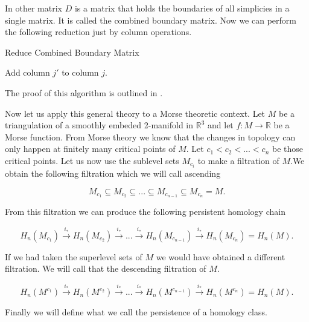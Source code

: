 In other matrix $D$ is a matrix that holds the boundaries of all simplicies in a single matrix. It is called the combined boundary matrix. Now we can perform the following reduction just by column operations.


\begin{algorithm}
\caption{Reduce Combined Boundary Matrix}

\begin{algorithmic}[1]


        \State Add column $j'$ to column $j$.
    \EndWhile
\EndFor

\end{algorithmic}
\end{algorithm}

The proof of this algorithm is outlined in \cite{persistence-original}.

Now let us apply this general theory to a Morse theoretic context. Let $M$ be a triangulation of a smoothly embeded 2-manifold in $\mathbb{R}^3$ and let $f : M \to \mathbb{R}$ be a Morse function. From Morse theory we know that the changes in topology can only happen at finitely many critical points of $M$. Let $c_1 < c_2 < ... < c_n$ be those critical points. Let us now use the sublevel sets $M_{c_i}$  to make a filtration of $M$.We obtain the following filtration which we will call ascending

$$ M_{c_1} \subseteq M_{c_2} \subseteq ... \subseteq M_{c_{n-1}} \subseteq M_{c_n} = M.$$

From this filtration we can produce the following persistent homology chain

$$ H_n(M_{c_1}) \overset{i_*}{\longrightarrow} H_n(M_{c_2}) \overset{i_*}{\longrightarrow} ... \overset{i_*}{\longrightarrow} H_n(M_{c_{n-1}}) \overset{i_*}{\longrightarrow} H_n(M_{c_n}) = H_n(M).$$

If we had taken the superlevel sets of $M$ we would have obtained a different filtration. We will call that the descending filtration of $M$.

$$ H_n(M^{c_1}) \overset{i_*}{\longrightarrow} H_n(M^{c_2}) \overset{i_*}{\longrightarrow} ... \overset{i_*}{\longrightarrow} H_n(M^{c_{n-1}}) \overset{i_*}{\longrightarrow} H_n(M^{c_n}) = H_n(M).$$




Finally we will define what we call the persistence of a homology class.

